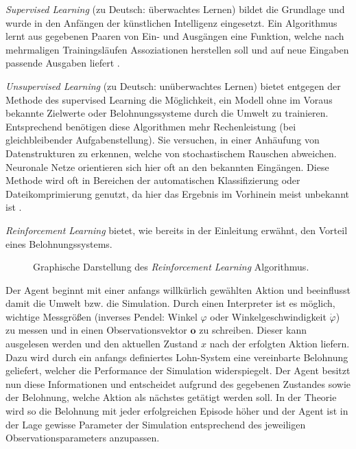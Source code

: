 	\textit{Supervised Learning} (zu Deutsch: überwachtes Lernen) bildet die Grundlage und wurde in den Anfängen der künstlichen Intelligenz eingesetzt. Ein Algorithmus lernt aus gegebenen Paaren von Ein- und Ausgängen eine Funktion, welche nach mehrmaligen Trainingsläufen Assoziationen herstellen soll und auf neue Eingaben passende Ausgaben liefert \cite{DeepLearning}.
	
	\textit{Unsupervised Learning} (zu Deutsch: unüberwachtes Lernen) bietet entgegen der Methode des supervised Learning die Möglichkeit, ein Modell ohne im Voraus bekannte Zielwerte oder Belohnungssysteme durch die Umwelt zu trainieren. Entsprechend benötigen diese Algorithmen mehr Rechenleistung (bei gleichbleibender Aufgabenstellung). Sie versuchen, in einer Anhäufung von Datenstrukturen zu erkennen, welche von stochastischem Rauschen abweichen. Neuronale Netze orientieren sich hier oft an den bekannten Eingängen. Diese Methode wird oft in Bereichen der automatischen Klassifizierung oder Dateikomprimierung genutzt, da hier das Ergebnis im Vorhinein meist unbekannt ist \cite{DeepLearning}.
	
	\textit{Reinforcement Learning} bietet, wie bereits in der Einleitung erwähnt, den Vorteil eines Belohnungssystems.
	\begin{figure}[H] %
		\centering
		\def\svgwidth{12cm}
		
		\caption{Graphische Darstellung des \textit{Reinforcement Learning} Algorithmus.}
		\label{fig:rl_chart}
	\end{figure}
	Der Agent beginnt mit einer anfangs willkürlich gewählten Aktion und beeinflusst damit die Umwelt bzw. die Simulation. Durch einen Interpreter ist es möglich, wichtige Messgrößen (inverses Pendel: Winkel $\varphi$ oder Winkelgeschwindigkeit $\dot{\varphi}$) zu messen und in einen Observationsvektor $\textbf{o}$ zu schreiben. Dieser kann ausgelesen werden und den aktuellen Zustand $x$ nach der erfolgten Aktion liefern. Dazu wird durch ein anfangs definiertes Lohn-System eine vereinbarte Belohnung geliefert, welcher die Performance der Simulation widerspiegelt. Der Agent besitzt nun diese Informationen und entscheidet aufgrund des gegebenen Zustandes sowie der Belohnung, welche Aktion als nächstes getätigt werden soll. In der Theorie wird so die Belohnung mit jeder erfolgreichen Episode höher und der Agent ist in der Lage gewisse Parameter der Simulation entsprechend des jeweiligen Observationsparameters anzupassen.
	
